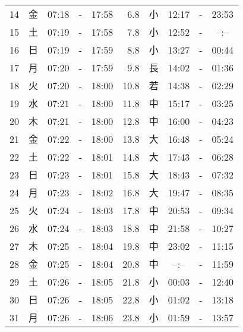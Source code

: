 \documentclass[a4j,10pt]{jsarticle}
\begin{document}
\begin{center}
\begin{table}[ht]
\begin{center}
\begin{tabular}{|rc|ccc|rc|ccc|}
 14 & 金 & 07:18 &-& 17:58 &  6.8 & 小 & 12:17 &-& 23:53 \\
 15 & 土 & 07:19 &-& 17:58 &  7.8 & 小 & 12:52 &-& --:-- \\
 16 & 日 & 07:19 &-& 17:59 &  8.8 & 小 & 13:27 &-& 00:44 \\
 17 & 月 & 07:20 &-& 17:59 &  9.8 & 長 & 14:02 &-& 01:36 \\
 18 & 火 & 07:20 &-& 18:00 & 10.8 & 若 & 14:38 &-& 02:29 \\
 19 & 水 & 07:21 &-& 18:00 & 11.8 & 中 & 15:17 &-& 03:25 \\
 20 & 木 & 07:21 &-& 18:00 & 12.8 & 中 & 16:00 &-& 04:23 \\
 21 & 金 & 07:22 &-& 18:00 & 13.8 & 大 & 16:48 &-& 05:24 \\
 22 & 土 & 07:22 &-& 18:01 & 14.8 & 大 & 17:43 &-& 06:28 \\
 23 & 日 & 07:23 &-& 18:01 & 15.8 & 大 & 18:43 &-& 07:32 \\
 24 & 月 & 07:23 &-& 18:02 & 16.8 & 大 & 19:47 &-& 08:35 \\
 25 & 火 & 07:24 &-& 18:03 & 17.8 & 中 & 20:53 &-& 09:34 \\
 26 & 水 & 07:24 &-& 18:03 & 18.8 & 中 & 21:58 &-& 10:27 \\
 27 & 木 & 07:25 &-& 18:04 & 19.8 & 中 & 23:02 &-& 11:15 \\
 28 & 金 & 07:25 &-& 18:04 & 20.8 & 中 & --:-- &-& 11:59 \\
 29 & 土 & 07:26 &-& 18:05 & 21.8 & 小 & 00:03 &-& 12:40 \\
 30 & 日 & 07:26 &-& 18:05 & 22.8 & 小 & 01:02 &-& 13:18 \\
 31 & 月 & 07:26 &-& 18:06 & 23.8 & 小 & 01:59 &-& 13:57 \\
\hline
\end{tabular}
\end{center}
\end{table}
\newpage
\end{center}
\end{document}

